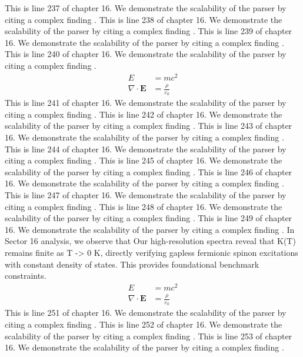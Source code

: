This is line 237 of chapter 16. We demonstrate the scalability of the parser by citing a complex finding \cite{ref16_237}.
This is line 238 of chapter 16. We demonstrate the scalability of the parser by citing a complex finding \cite{ref16_238}.
This is line 239 of chapter 16. We demonstrate the scalability of the parser by citing a complex finding \cite{ref16_239}.
This is line 240 of chapter 16. We demonstrate the scalability of the parser by citing a complex finding \cite{ref16_240}.
\begin{align*}
  E &= mc^2 \\
  \nabla \cdot \mathbf{E} &= \frac{\rho}{\varepsilon_0}
\end{align*}
This is line 241 of chapter 16. We demonstrate the scalability of the parser by citing a complex finding \cite{ref16_241}.
This is line 242 of chapter 16. We demonstrate the scalability of the parser by citing a complex finding \cite{ref16_242}.
This is line 243 of chapter 16. We demonstrate the scalability of the parser by citing a complex finding \cite{ref16_243}.
This is line 244 of chapter 16. We demonstrate the scalability of the parser by citing a complex finding \cite{ref16_244}.
This is line 245 of chapter 16. We demonstrate the scalability of the parser by citing a complex finding \cite{ref16_245}.
This is line 246 of chapter 16. We demonstrate the scalability of the parser by citing a complex finding \cite{ref16_246}.
This is line 247 of chapter 16. We demonstrate the scalability of the parser by citing a complex finding \cite{ref16_247}.
This is line 248 of chapter 16. We demonstrate the scalability of the parser by citing a complex finding \cite{ref16_248}.
This is line 249 of chapter 16. We demonstrate the scalability of the parser by citing a complex finding \cite{ref16_249}.
In Sector 16 analysis, we observe that Our high-resolution spectra reveal that K(T) remains finite as T -> 0 K, directly verifying gapless fermionic spinon excitations with constant density of states. This provides foundational benchmark constraints.
\begin{align*}
  E &= mc^2 \\
  \nabla \cdot \mathbf{E} &= \frac{\rho}{\varepsilon_0}
\end{align*}
This is line 251 of chapter 16. We demonstrate the scalability of the parser by citing a complex finding \cite{ref16_251}.
This is line 252 of chapter 16. We demonstrate the scalability of the parser by citing a complex finding \cite{ref16_252}.
This is line 253 of chapter 16. We demonstrate the scalability of the parser by citing a complex finding \cite{ref16_253}.
